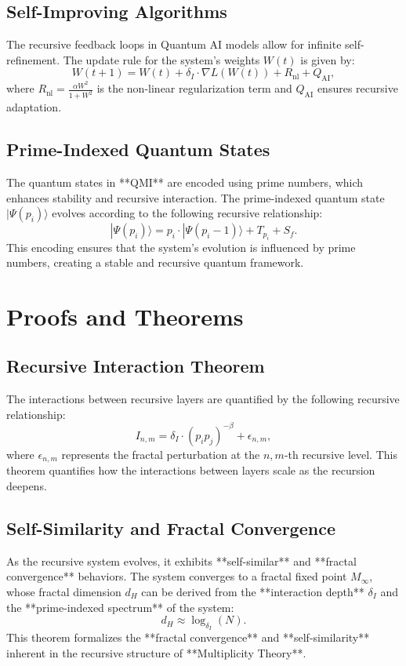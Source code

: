 \documentclass{article}
\theoremstyle{plain}
\begin{document}
\begin{itemize}
\subsection{Self-Improving Algorithms}
The recursive feedback loops in Quantum AI models allow for infinite self-refinement. The update rule for the system's weights \( W(t) \) is given by:
\[
W(t+1) = W(t) + \delta_I \cdot \nabla L(W(t)) + R_\text{nl} + Q_\text{AI},
\]
where \( R_\text{nl} = \frac{\alpha W^2}{1 + W^2} \) is the non-linear regularization term and \( Q_\text{AI} \) ensures recursive adaptation.

\subsection{Prime-Indexed Quantum States}
The quantum states in **QMI** are encoded using prime numbers, which enhances stability and recursive interaction. The prime-indexed quantum state \( |\Psi(p_i)\rangle \) evolves according to the following recursive relationship:
\[
|\Psi(p_i)\rangle = p_i \cdot |\Psi(p_i-1)\rangle + T_{p_i} + S_f.
\]
This encoding ensures that the system's evolution is influenced by prime numbers, creating a stable and recursive quantum framework.

\section{Proofs and Theorems}

\subsection{Recursive Interaction Theorem}
The interactions between recursive layers are quantified by the following recursive relationship:
\[
I_{n,m} = \delta_I \cdot (p_i p_j)^{-\beta} + \epsilon_{n,m},
\]
where \( \epsilon_{n,m} \) represents the fractal perturbation at the \( n, m \)-th recursive level. This theorem quantifies how the interactions between layers scale as the recursion deepens.
\subsection{Self-Similarity and Fractal Convergence}
As the recursive system evolves, it exhibits **self-similar** and **fractal convergence** behaviors. The system converges to a fractal fixed point \( M_\infty \), whose fractal dimension \( d_H \) can be derived from the **interaction depth** \( \delta_I \) and the **prime-indexed spectrum** of the system:
\[
d_H \approx \log_{\delta_I}(N).
\]
This theorem formalizes the **fractal convergence** and **self-similarity** inherent in the recursive structure of **Multiplicity Theory**.



\end{itemize}
\end{document}
